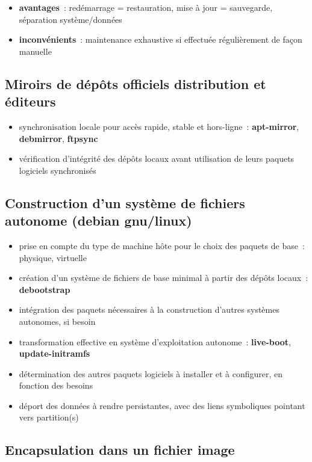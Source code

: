 \documentclass[10pt]{article}
\newenvironment{itmz}{\begin{itemize}
\setlength{\itemsep}{0em}
}{\end{itemize}}
\begin{document}
\begin{itmz}
\item{\textbf{avantages} : redémarrage = restauration, mise à jour = sauvegarde, séparation système/données}
\item{\textbf{inconvénients} : maintenance exhaustive si effectuée régulièrement de façon manuelle}
\end{itmz}

\subsection{Miroirs de dépôts officiels distribution et éditeurs}

\begin{itmz}
\item{synchronisation locale pour accès rapide, stable et hors-ligne : \textbf{apt-mirror}, \textbf{debmirror}, \textbf{ftpsync}}
\item{vérification d’intégrité des dépôts locaux avant utilisation de leurs paquets logiciels synchronisés}
\end{itmz}

\subsection{Construction d’un système de fichiers autonome (debian gnu/linux)}

\begin{itmz}
\item{prise en compte du type de machine hôte pour le choix des paquets de base : physique, virtuelle}
\item{création d’un système de fichiers de base minimal à partir des dépôts locaux : \textbf{debootstrap}}
\item{intégration des paquets nécessaires à la construction d’autres systèmes autonomes, si besoin}
\item{transformation effective en système d’exploitation autonome : \textbf{live-boot}, \textbf{update-initramfs}}
\item{détermination des autres paquets logiciels à installer et à configurer, en fonction des besoins}
\item{déport des données à rendre persistantes, avec des liens symboliques pointant vers partition(s)}
\end{itmz}

\subsection{Encapsulation dans un fichier image}
\end{document}
